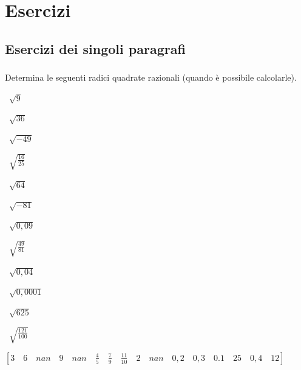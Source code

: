 
\section{Esercizi}

\subsection{Esercizi dei singoli paragrafi}
\subsubsection*{}


\begin{esercizio}
 \label{ese:2.01}
Determina le seguenti radici quadrate razionali 
(quando è possibile calcolarle).
\vspace{-.7em}
\begin{multicols}{4}
 \begin{enumeratea}
 \item~$\sqrt 9$
 \item~$\sqrt{36}$
 \item~$\sqrt{-49}$
 \item~$\sqrt{\frac{16}{25}}$
 \item~$\sqrt{64}$
 \item~$\sqrt{-81}$
 \item~$\sqrt{0,09}$
 \item~$\sqrt{\frac{49}{81}}$
 \item~$\sqrt{0,04}$
 \item~$\sqrt{0,0001}$
 \item~$\sqrt{625}$
 \item~$\sqrt{\frac{121}{100}}$
 \end{enumeratea}
 \end{multicols}
\begin{flushright}
\vspace*{-8pt}
 $[3 \quad 6 \quad nan \quad 9 \quad nan \quad 
 \frac{4}{5} \quad \frac{7}{9} \quad \frac{11}{10} \quad 2 \quad 
 nan \quad 0,2 \quad 0,3 \quad 0.1 \quad 25 \quad 0,4 \quad 12]$
\end{flushright}
\vspace{-.7em}
\end{esercizio}

